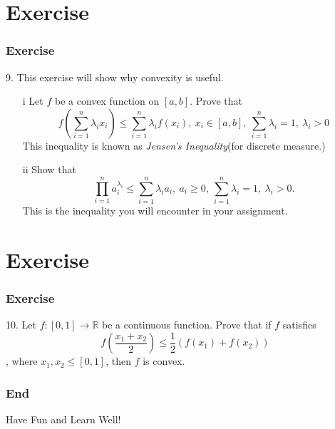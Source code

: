 \documentclass[12pt, t]{beamer}
\renewcommand{\emph}[1]{{\color{Turquoise3}\textsl{#1}}}
\begin{document}
\section{Exercise}
\begin{frame}
    \frametitle{Exercise}
    9. This exercise will show why convexity is useful.
    \begin{enumerate}
        \item[i]    Let $f$ be a convex function on $[a,b]$. Prove that
            \begin{equation*}
                f(\sum^n_{i=1}\lambda_i x_i)\leq \sum^n_{i=1}\lambda_i f(x_i),\ x_i\in[a,b],\ \sum^n_{i=1}\lambda_i=1,\ \lambda_i>0
            \end{equation*}
            This inequality is known as \emph{Jensen's Inequality}(for discrete measure.)
        \item[ii] Show that
            \begin{equation*}
                \prod^n_{i=1} a_i^{\lambda_i}\leq \sum^n_{i=1}\lambda_i a_i,\ a_i\geq 0,\ \sum^n_{i=1}\lambda_i=1,\ \lambda_i>0.
            \end{equation*}
            This is the inequality you will encounter in your assignment.
    \end{enumerate}
\end{frame}

\section{Exercise}
\begin{frame}
    \frametitle{Exercise}
    10. Let $f:[0,1]\rightarrow\mathbb{R}$ be a continuous function. Prove that if $f$ satisfies
    \begin{equation*}
        f(\frac{x_1+x_2}{2})\leq \frac{1}{2}(f(x_1)+f(x_2))
    \end{equation*}
    , where $x_1,x_2\leq[0,1]$, then $f$ is convex.
\end{frame}

\begin{frame}
    \frametitle{End}
    \vspace{2cm}
    \Huge \center  Have Fun and Learn Well!
\end{frame}
\end{document}
